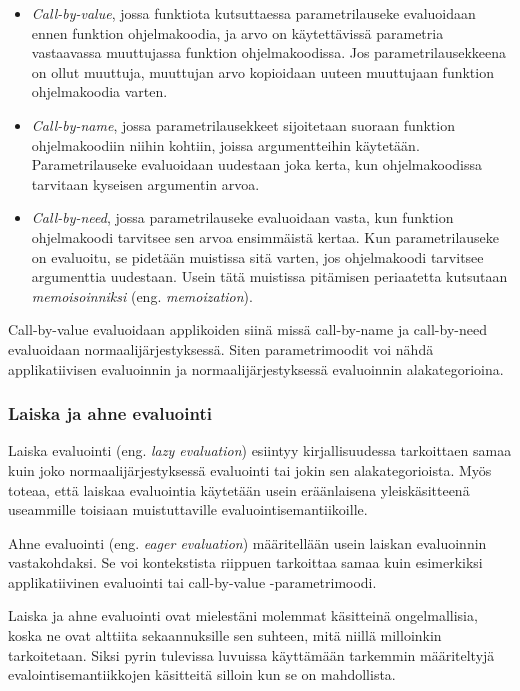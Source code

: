 \begin{itemize}
	\item \textit{Call-by-value}, jossa funktiota kutsuttaessa parametrilauseke evaluoidaan ennen funktion ohjelmakoodia, ja arvo on käytettävissä parametria vastaavassa muuttujassa funktion ohjelmakoodissa. Jos parametrilausekkeena on ollut muuttuja, muuttujan arvo kopioidaan uuteen muuttujaan funktion ohjelmakoodia varten. \citep{scott2009programming}
    \item \textit{Call-by-name}, jossa parametrilausekkeet sijoitetaan suoraan funktion ohjelmakoodiin niihin kohtiin, joissa argumentteihin käytetään. Parametrilauseke evaluoidaan uudestaan joka kerta, kun ohjelmakoodissa tarvitaan kyseisen argumentin arvoa. \citep{ariola1995callbyneed}
    \item \textit{Call-by-need}, jossa parametrilauseke evaluoidaan vasta, kun funktion ohjelmakoodi tarvitsee sen arvoa ensimmäistä kertaa. Kun parametrilauseke on evaluoitu, se pidetään muistissa sitä varten, jos ohjelmakoodi tarvitsee argumenttia uudestaan. Usein tätä muistissa pitämisen periaatetta kutsutaan \textit{memoisoinniksi} (eng. \textit{memoization}). \citep{ariola1995callbyneed}
\end{itemize}

Call-by-value evaluoidaan applikoiden siinä missä call-by-name ja call-by-need evaluoidaan normaalijärjestyksessä. Siten parametrimoodit voi nähdä applikatiivisen evaluoinnin ja normaalijärjestyksessä evaluoinnin alakategorioina.

\subsubsection{Laiska ja ahne evaluointi}

Laiska evaluointi (eng. \textit{lazy evaluation}) esiintyy kirjallisuudessa tarkoittaen samaa kuin joko normaalijärjestyksessä evaluointi tai jokin sen alakategorioista. Myös \citet{scott2009programming} toteaa, että laiskaa evaluointia käytetään usein eräänlaisena yleiskäsitteenä useammille toisiaan muistuttaville evaluointisemantiikoille.

Ahne evaluointi (eng. \textit{eager evaluation}) määritellään usein laiskan evaluoinnin vastakohdaksi. Se voi kontekstista riippuen tarkoittaa samaa kuin esimerkiksi applikatiivinen evaluointi tai call-by-value -parametrimoodi.

Laiska ja ahne evaluointi ovat mielestäni molemmat käsitteinä ongelmallisia, koska ne ovat alttiita sekaannuksille sen suhteen, mitä niillä milloinkin tarkoitetaan. Siksi pyrin tulevissa luvuissa käyttämään tarkemmin määriteltyjä evalointisemantiikkojen käsitteitä silloin kun se on mahdollista.

